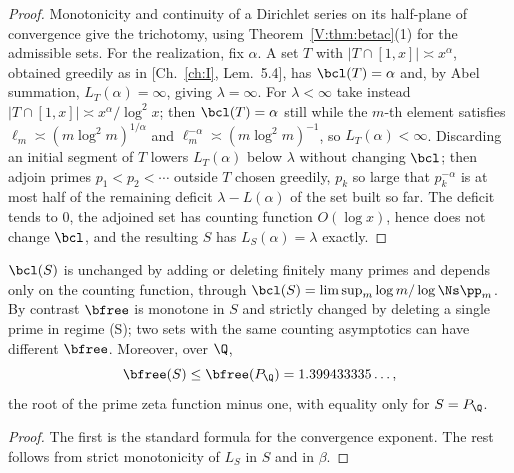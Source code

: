 \begin{proof}
Monotonicity and continuity of a Dirichlet series on its half-plane of convergence give the
trichotomy, using Theorem~\ref{V:thm:betac}(1) for the admissible sets. For the realization,
fix $\alpha$. A set $T$ with $|T\cap[1,x]|\asymp x^\alpha$, obtained greedily as in
[Ch.~\ref{ch:I}, Lem.~5.4], has $\bcl(T)=\alpha$ and, by Abel summation, $L_T(\alpha)=\infty$,
giving $\lambda=\infty$. For $\lambda<\infty$ take instead
$|T\cap[1,x]|\asymp x^\alpha/\log^2x$; then $\bcl(T)=\alpha$ still while the $m$-th element
satisfies $\ell_m\asymp(m\log^2m)^{1/\alpha}$ and $\ell_m^{-\alpha}\asymp(m\log^2m)^{-1}$, so
$L_T(\alpha)<\infty$. Discarding an initial segment of $T$ lowers $L_T(\alpha)$ below
$\lambda$ without changing $\bcl$; then adjoin primes $p_1<p_2<\cdots$ outside $T$ chosen
greedily, $p_k$ so large that $p_k^{-\alpha}$ is at most half of the remaining deficit
$\lambda-L(\alpha)$ of the set built so far. The deficit tends to $0$, the adjoined set has
counting function $O(\log x)$, hence does not change $\bcl$, and the resulting $S$ has
$L_S(\alpha)=\lambda$ exactly.
\end{proof}

\begin{proposition}\label{V:prop:tail}
$\bcl(S)$ is unchanged by adding or deleting finitely many primes and depends only on the
counting function, through $\bcl(S)=\limsup_m\log m/\log\Ns\pp_m$. By contrast $\bfree$ is
monotone in $S$ and strictly changed by deleting a single prime in regime (S); two sets with
the same counting asymptotics can have different $\bfree$. Moreover, over $\Q$,
\[
\bfree(S)\le\bfree(P_\Q)=1.399433335\ldots ,
\]
the root of the prime zeta function minus one, with equality only for $S=P_\Q$.
\end{proposition}

\begin{proof}
The first is the standard formula for the convergence exponent. The rest follows from strict
monotonicity of $L_S$ in $S$ and in $\beta$.
\end{proof}

